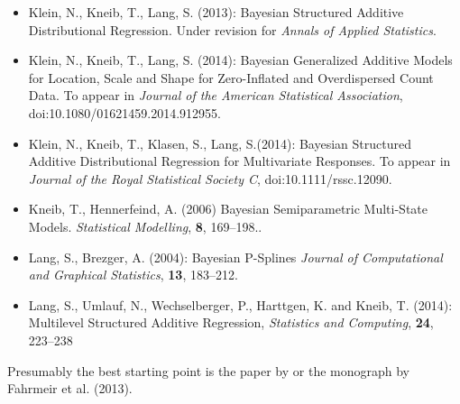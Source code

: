 \documentclass[11pt,a4paper,twoside]{bayesxarticle}
\begin{document}
\begin{itemize}
\item Klein, N., Kneib, T., Lang, S. (2013): Bayesian Structured Additive Distributional Regression.  Under revision for {\it Annals of Applied Statistics}.\vspace{-0.25cm}
\item Klein, N., Kneib, T., Lang, S. (2014): Bayesian Generalized Additive Models for Location, Scale and Shape for Zero-Inflated and Overdispersed Count Data. To appear in {\it Journal of the American Statistical Association}, doi:10.1080/01621459.2014.912955.\vspace{-0.25cm}
\item Klein, N., Kneib, T., Klasen, S., Lang, S.(2014): Bayesian Structured Additive Distributional Regression for Multivariate Responses. To appear in {\it Journal of the Royal Statistical Society C}, doi:10.1111/rssc.12090.\vspace{-0.25cm}
\item Kneib, T., Hennerfeind, A. (2006) Bayesian Semiparametric Multi-State Models. {\it Statistical Modelling}, {\bf 8},
    169--198..\vspace{-0.25cm}
\item Lang, S., Brezger, A. (2004): Bayesian P-Splines {\it Journal of Computational and Graphical Statistics}, {\bf 13},
    183--212.\vspace{-0.25cm}
\item Lang, S., Umlauf, N., Wechselberger, P., Harttgen, K. and Kneib, T. (2014): Multilevel Structured Additive Regression, {\it Statistics and Computing}, {\bf 24}, 223--238
\end{itemize}

Presumably the best starting point is the paper by  or the monograph by Fahrmeir et al. (2013).
\end{document}
